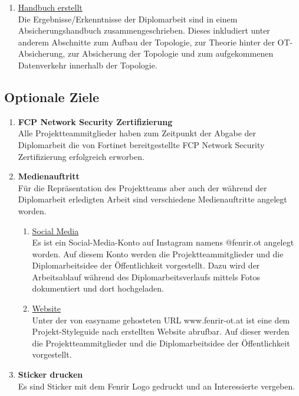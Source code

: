 \documentclass[
	headings=optiontotocandhead,%
	oneside,
	numbers=noenddot,%
	toc=flat, %
	10pt, %
	parskip=full, %
	listof=totoc, %
	listof=flat, %
	numbers=noenddot, %
	bibliography=totoc, %
	a4paper,DIV=14,
]{scrartcl}
\begin{document}
\begin{enumerate}[start=1,label={\bfseries Ziel-H \arabic*},leftmargin=*,wide]
\begin{enumerate}[label=\alph*.]
\item{\underline{Handbuch erstellt}}\\
Die Ergebnisse/Erkenntnisse der Diplomarbeit sind in einem Absicherungshandbuch zusammengeschrieben. Dieses inkludiert unter anderem Abschnitte zum Aufbau der Topologie, zur Theorie hinter der OT-Absicherung, zur Absicherung der Topologie und zum aufgekommenen Datenverkehr innerhalb der Topologie.
\end{enumerate}
\end{enumerate}

\subsection{Optionale Ziele}
\begin{enumerate}[start=1,label={\bfseries Ziel-O \arabic*},leftmargin=*,wide]
\item{\bfseries{FCP Network Security Zertifizierung}}\\
Alle Projektteammitglieder haben zum Zeitpunkt der Abgabe der Diplomarbeit die von Fortinet bereitgestellte FCP Network Security Zertifizierung erfolgreich erworben.

\item{\bfseries{Medienauftritt}}\\
Für die Repräsentation des Projektteams aber auch der während der Diplomarbeit erledigten Arbeit sind verschiedene Medienauftritte angelegt worden.

\begin{enumerate}[label=\alph*.]
\item{\underline{Social Media}}\\
Es ist ein Social-Media-Konto auf Instagram namens @fenrir.ot angelegt worden. Auf diesem Konto werden die Projektteammitglieder und die Diplomarbeitsidee der Öffentlichkeit vorgestellt. Dazu wird der Arbeitsablauf während des Diplomarbeitsverlaufs mittels Fotos dokumentiert und dort hochgeladen.

\item{\underline{Website}}\\
Unter der von easyname gehosteten URL www.fenrir-ot.at ist eine dem Projekt-Styleguide nach erstellten Website abrufbar. Auf dieser werden die Projektteammitglieder und die Diplomarbeitsidee der Öffentlichkeit vorgestellt.
\end{enumerate}

\item{\bfseries{Sticker drucken}}\\
Es sind Sticker mit dem Fenrir Logo gedruckt und an Interessierte vergeben.
\end{enumerate}
\end{document}
